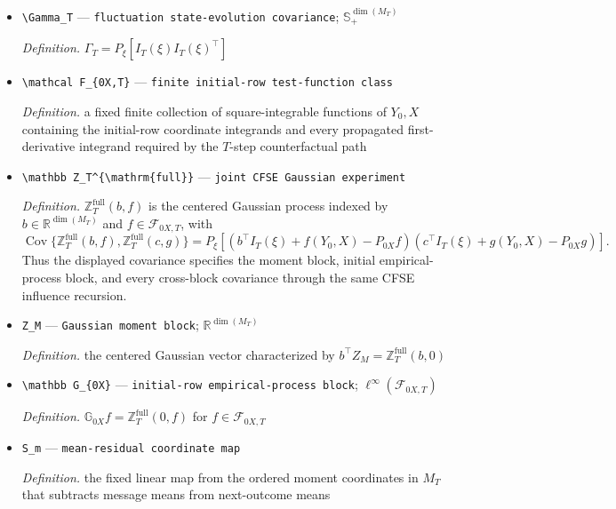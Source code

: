 \documentclass{article}
\begin{document}
\begin{itemize}
  \item \texttt{\textbackslash{}\allowbreak{}Gamma\_\allowbreak{}T} --- \texttt{fluctuation state-\allowbreak{}evolution covariance}; \(\mathbb S_+^{\dim(M_T)}\)
  \par\smallskip\noindent\emph{Definition.} \(\Gamma_T=P_\xi[I_T(\xi)I_T(\xi)^{\top}]\)
  \item \texttt{\textbackslash{}\allowbreak{}mathcal F\_\allowbreak{}\{0X,\allowbreak{}T\}\allowbreak{}} --- \texttt{finite initial-\allowbreak{}row test-\allowbreak{}function class}
  \par\smallskip\noindent\emph{Definition.} a fixed finite collection of square-integrable functions of \(Y_0,X\) containing the initial-row coordinate integrands and every propagated first-derivative integrand required by the \(T\)-step counterfactual path
  \item \texttt{\textbackslash{}\allowbreak{}mathbb Z\_\allowbreak{}T\textasciicircum{}\{\textbackslash{}\allowbreak{}mathrm\{full\}\allowbreak{}\}\allowbreak{}} --- \texttt{joint CFSE Gaussian experiment}
  \par\smallskip\noindent\emph{Definition.} \(\mathbb Z_T^{\mathrm{full}}(b,f)\) is the centered Gaussian process indexed by \(b\in\mathbb R^{\dim(M_T)}\) and \(f\in\mathcal F_{0X,T}\), with \[\operatorname{Cov}\{\mathbb Z_T^{\mathrm{full}}(b,f),\mathbb Z_T^{\mathrm{full}}(c,g)\}=P_\xi[(b^{\top}I_T(\xi)+f(Y_0,X)-P_{0X}f)(c^{\top}I_T(\xi)+g(Y_0,X)-P_{0X}g)].\] Thus the displayed covariance specifies the moment block, initial empirical-process block, and every cross-block covariance through the same CFSE influence recursion.
  \item \texttt{Z\_\allowbreak{}M} --- \texttt{Gaussian moment block}; \(\mathbb R^{\dim(M_T)}\)
  \par\smallskip\noindent\emph{Definition.} the centered Gaussian vector characterized by \(b^{\top}Z_M=\mathbb Z_T^{\mathrm{full}}(b,0)\)
  \item \texttt{\textbackslash{}\allowbreak{}mathbb G\_\allowbreak{}\{0X\}\allowbreak{}} --- \texttt{initial-\allowbreak{}row empirical-\allowbreak{}process block}; \(\ell^\infty(\mathcal F_{0X,T})\)
  \par\smallskip\noindent\emph{Definition.} \(\mathbb G_{0X}f=\mathbb Z_T^{\mathrm{full}}(0,f)\) for \(f\in\mathcal F_{0X,T}\)
  \item \texttt{S\_\allowbreak{}m} --- \texttt{mean-\allowbreak{}residual coordinate map}
  \par\smallskip\noindent\emph{Definition.} the fixed linear map from the ordered moment coordinates in \(M_T\) that subtracts message means from next-outcome means

\end{itemize}
\end{document}
